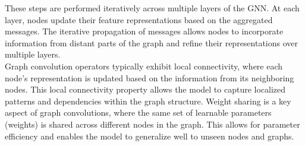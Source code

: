 These steps are performed iteratively across multiple layers of the GNN. At each layer, nodes update their feature representations based on the aggregated messages. The iterative propagation of messages allows nodes to incorporate information from distant parts of the graph and refine their representations over multiple layers. \\
Graph convolution operators typically exhibit local connectivity, where each node's representation is updated based on the information from its neighboring nodes.
This local connectivity property allows the model to capture localized patterns and dependencies within the graph structure. Weight sharing is a key aspect of graph convolutions, where the same set of learnable parameters (weights) is shared across different nodes in the graph. This allows for parameter efficiency and enables the model to generalize well to unseen nodes and graphs. 

